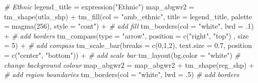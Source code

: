 \documentclass[
]{book}
\newenvironment{Shaded}{\begin{snugshade}}{\end{snugshade}}
\newcommand{\AttributeTok}[1]{\textcolor[rgb]{0.77,0.63,0.00}{#1}}
\newcommand{\CommentTok}[1]{\textcolor[rgb]{0.56,0.35,0.01}{\textit{#1}}}
\newcommand{\DecValTok}[1]{\textcolor[rgb]{0.00,0.00,0.81}{#1}}
\newcommand{\FloatTok}[1]{\textcolor[rgb]{0.00,0.00,0.81}{#1}}
\newcommand{\FunctionTok}[1]{\textcolor[rgb]{0.00,0.00,0.00}{#1}}
\newcommand{\NormalTok}[1]{#1}
\newcommand{\OtherTok}[1]{\textcolor[rgb]{0.56,0.35,0.01}{#1}}
\newcommand{\SpecialCharTok}[1]{\textcolor[rgb]{0.00,0.00,0.00}{#1}}
\newcommand{\StringTok}[1]{\textcolor[rgb]{0.31,0.60,0.02}{#1}}
\begin{document}
\begin{Shaded}
\begin{Highlighting}[]
  \CommentTok{\# Ethnic}
\NormalTok{legend\_title }\OtherTok{=} \FunctionTok{expression}\NormalTok{(}\StringTok{"Ethnic"}\NormalTok{)}
\NormalTok{map\_abgwr2 }\OtherTok{=} \FunctionTok{tm\_shape}\NormalTok{(utla\_shp) }\SpecialCharTok{+}
  \FunctionTok{tm\_fill}\NormalTok{(}\AttributeTok{col =} \StringTok{"amb\_ethnic"}\NormalTok{, }\AttributeTok{title =}\NormalTok{ legend\_title, }\AttributeTok{palette =} \FunctionTok{magma}\NormalTok{(}\DecValTok{256}\NormalTok{), }\AttributeTok{style =} \StringTok{"cont"}\NormalTok{) }\SpecialCharTok{+} \CommentTok{\# add fill}
  \FunctionTok{tm\_borders}\NormalTok{(}\AttributeTok{col =} \StringTok{"white"}\NormalTok{, }\AttributeTok{lwd =}\NormalTok{ .}\DecValTok{1}\NormalTok{)  }\SpecialCharTok{+} \CommentTok{\# add borders}
  \FunctionTok{tm\_compass}\NormalTok{(}\AttributeTok{type =} \StringTok{"arrow"}\NormalTok{, }\AttributeTok{position =} \FunctionTok{c}\NormalTok{(}\StringTok{"right"}\NormalTok{, }\StringTok{"top"}\NormalTok{) , }\AttributeTok{size =} \DecValTok{5}\NormalTok{) }\SpecialCharTok{+} \CommentTok{\# add compass}
  \FunctionTok{tm\_scale\_bar}\NormalTok{(}\AttributeTok{breaks =} \FunctionTok{c}\NormalTok{(}\DecValTok{0}\NormalTok{,}\DecValTok{1}\NormalTok{,}\DecValTok{2}\NormalTok{), }\AttributeTok{text.size =} \FloatTok{0.7}\NormalTok{, }\AttributeTok{position =}  \FunctionTok{c}\NormalTok{(}\StringTok{"center"}\NormalTok{, }\StringTok{"bottom"}\NormalTok{)) }\SpecialCharTok{+} \CommentTok{\# add scale bar}
  \FunctionTok{tm\_layout}\NormalTok{(}\AttributeTok{bg.color =} \StringTok{"white"}\NormalTok{) }\CommentTok{\# change background colour}
\NormalTok{map\_abgwr2 }\OtherTok{=}\NormalTok{ map\_abgwr2 }\SpecialCharTok{+} \FunctionTok{tm\_shape}\NormalTok{(reg\_shp) }\SpecialCharTok{+} \CommentTok{\# add region boundaries}
  \FunctionTok{tm\_borders}\NormalTok{(}\AttributeTok{col =} \StringTok{"white"}\NormalTok{, }\AttributeTok{lwd =}\NormalTok{ .}\DecValTok{5}\NormalTok{) }\CommentTok{\# add borders}


\end{Highlighting}
\end{Shaded}
\end{document}
